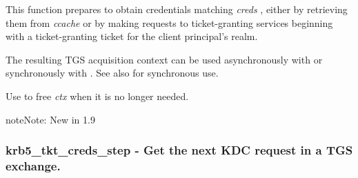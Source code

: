 \documentclass[letterpaper,10pt,english]{sphinxmanual}
\begin{document}
This function prepares to obtain credentials matching \emph{creds} , either by retrieving them from \emph{ccache} or by making requests to ticket-granting services beginning with a ticket-granting ticket for the client principal's realm.

The resulting TGS acquisition context can be used asynchronously with {\hyperref[appdev/refs/api/krb5_tkt_creds_step:krb5_tkt_creds_step]{}} or synchronously with {\hyperref[appdev/refs/api/krb5_tkt_creds_get:krb5_tkt_creds_get]{}} . See also {\hyperref[appdev/refs/api/krb5_get_credentials:krb5_get_credentials]{}} for synchronous use.

Use {\hyperref[appdev/refs/api/krb5_tkt_creds_free:krb5_tkt_creds_free]{}} to free \emph{ctx} when it is no longer needed.

\begin{notice}{note}{Note:}
New in 1.9
\end{notice}


\subsubsection{krb5\_tkt\_creds\_step -  Get the next KDC request in a TGS exchange.}
\label{appdev/refs/api/krb5_tkt_creds_step:krb5-tkt-creds-step-get-the-next-kdc-request-in-a-tgs-exchange}\label{appdev/refs/api/krb5_tkt_creds_step::doc}

\begin{fulllineitems}
\label{appdev/refs/api/krb5_tkt_creds_step:krb5_tkt_creds_step}
\end{fulllineitems}
\end{document}
